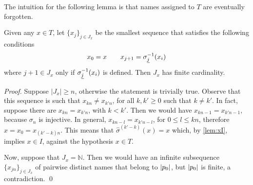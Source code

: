 The intuition for the following lemma is that names assigned to $T$ are eventually forgotten.

\begin{lemma}
\label{lem:rho-forget}
Given any $x \in T$, let $\{x_j\}_{j \in J_x}$ be the smallest sequence that satisfies the following conditions
\[
	x_0 = x \qquad
	x_{j+1} = \sigma_{{\underline{j}}}^{-1}(x_i)
\]
where $j+1 \in J_x$ only if $\sigma_{{\underline{j}}}^{-1}(x_i)$ is defined. Then $J_x$ has finite cardinality.

\end{lemma}
\begin{proof}
Suppose $|J_x| \geq n$, otherwise the statement is trivially true. Observe that this sequence is such that $x_{kn} \neq x_{k'n}$, for all $k,k' \geq 0$ such that $k \neq k'$. In fact, suppose there are $x_{kn} = x_{k'n}$, with $k < k'$. Then we would have $x_{kn-1} = x_{k'n-1}$, because $\sigma_{n}$ is injective. In general, $x_{kn-l} = x_{k'n-l}$, for $0 \leq l \leq kn$, therefore $x = x_0 = x_{(k'-k)n}$. This means that $\widehat{\sigma}^{(k'-k)}(x) = x$ which, by \cref{lem:xI}, implies $x \in I$, against the hypothesis $x \in T$.

Now, suppose that $J_x = \mathbb{N}$. Then we would have an infinite subsequence $\{x_{jn}\}_{j \in J_x}$ of pairwise distinct names that belong to $|p_0|$, but $|p_0|$ is finite, a contradiction.
\qed
\end{proof}
%



